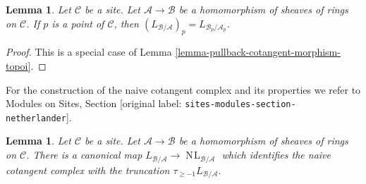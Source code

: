 \documentclass[10pt,a4paper]{article}
\theoremstyle{plain}
\newtheorem{lemma}[subsection]{Lemma}
\theoremstyle{definition}
\theoremstyle{remark}
\numberwithin{equation}{subsection}
\def\NL{\mathop{N\!L}\nolimits}
\begin{document}
\begin{lemma}
\label{lemma-stalk-cotangent-complex}
Let $\mathcal{C}$ be a site. Let $\mathcal{A} \to \mathcal{B}$ be a
homomorphism of sheaves of rings on $\mathcal{C}$. If $p$ is a point
of $\mathcal{C}$, then
$(L_{\mathcal{B}/\mathcal{A}})_p = L_{\mathcal{B}_p/\mathcal{A}_p}$.
\end{lemma}

\begin{proof}
This is a special case of Lemma \ref{lemma-pullback-cotangent-morphism-topoi}.
\end{proof}

\noindent
For the construction of the naive cotangent complex and its properties
we refer to
Modules on Sites, Section \textnormal{[original label: \nolinkurl{sites-modules-section-netherlander}]}.

\begin{lemma}
\label{lemma-compare-cotangent-complex-with-naive}
Let $\mathcal{C}$ be a site. Let $\mathcal{A} \to \mathcal{B}$ be a
homomorphism of sheaves of rings on $\mathcal{C}$.
There is a canonical map
$L_{\mathcal{B}/\mathcal{A}} \to \NL_{\mathcal{B}/\mathcal{A}}$
which identifies the naive cotangent complex with the truncation
$\tau_{\geq -1}L_{\mathcal{B}/\mathcal{A}}$.
\end{lemma}
\end{document}

